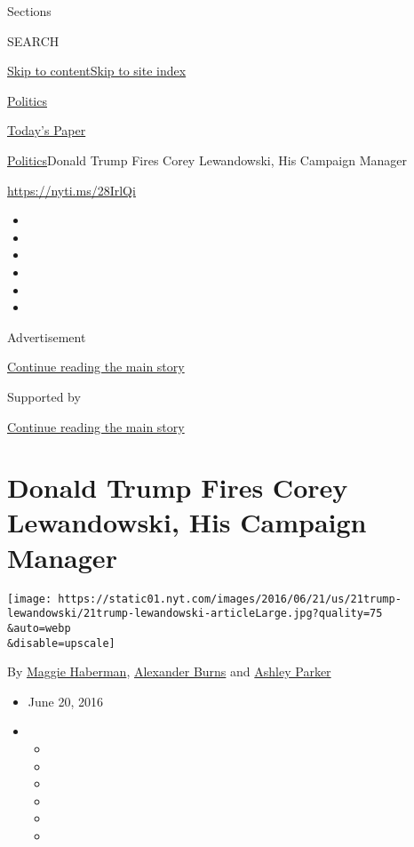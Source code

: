 Sections

SEARCH

\protect\hyperlink{site-content}{Skip to
content}\protect\hyperlink{site-index}{Skip to site index}

\href{https://www.nytimes.com/section/politics}{Politics}

\href{https://myaccount.nytimes.com/auth/login?response_type=cookie\&client_id=vi}{}

\href{https://www.nytimes.com/section/todayspaper}{Today's Paper}

\href{/section/politics}{Politics}\textbar{}Donald Trump Fires Corey
Lewandowski, His Campaign Manager

\url{https://nyti.ms/28IrlQi}

\begin{itemize}
\item
\item
\item
\item
\item
\item
\end{itemize}

Advertisement

\protect\hyperlink{after-top}{Continue reading the main story}

Supported by

\protect\hyperlink{after-sponsor}{Continue reading the main story}

\hypertarget{donald-trump-fires-corey-lewandowski-his-campaign-manager}{%
\section{Donald Trump Fires Corey Lewandowski, His Campaign
Manager}\label{donald-trump-fires-corey-lewandowski-his-campaign-manager}}

\texttt{[image: https://static01.nyt.com/images/2016/06/21/us/21trump-lewandowski/21trump-lewandowski-articleLarge.jpg?quality=75\\\&auto=webp\\\&disable=upscale]}

By \href{https://www.nytimes.com/by/maggie-haberman}{Maggie Haberman},
\href{https://www.nytimes.com/by/alexander-burns}{Alexander Burns} and
\href{https://www.nytimes.com/by/ashley-parker}{Ashley Parker}

\begin{itemize}
\item
  June 20, 2016
\item
  \begin{itemize}
  \item
  \item
  \item
  \item
  \item
  \item
  \end{itemize}
\end{itemize}

